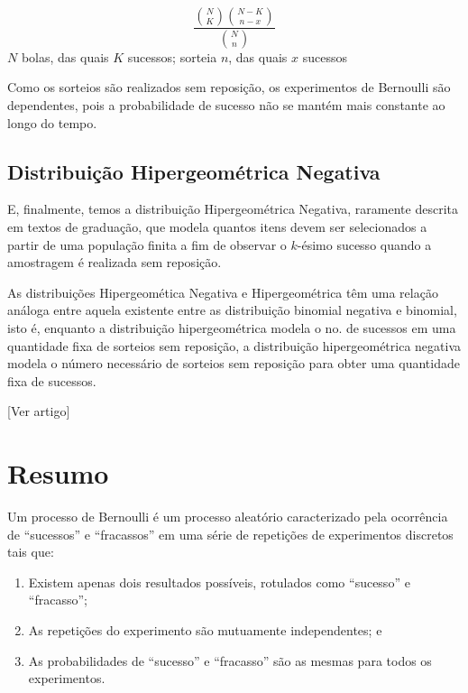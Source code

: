 \documentclass[
]{book}
\providecommand{\tightlist}{%
  \setlength{\itemsep}{0pt}\setlength{\parskip}{0pt}}
\theoremstyle{definition}
\theoremstyle{definition}
\theoremstyle{definition}
\theoremstyle{remark}
\begin{document}
\[\frac{\binom{N}{K}{\binom{N-K}{n-x}}}{\binom{N}{n}}\]
\(N\) bolas, das quais \(K\) sucessos; sorteia \(n\), das quais \(x\) sucessos

Como os sorteios são realizados sem reposição, os experimentos de Bernoulli são dependentes, pois a probabilidade de sucesso não se mantém mais constante ao longo do tempo.

\hypertarget{distribuiuxe7uxe3o-hipergeomuxe9trica-negativa}{%
\subsection*{Distribuição Hipergeométrica Negativa}\label{distribuiuxe7uxe3o-hipergeomuxe9trica-negativa}}

E, finalmente, temos a distribuição Hipergeométrica Negativa, raramente descrita em textos de graduação, que modela quantos itens devem ser selecionados a partir de uma população finita a fim de observar o \(k\)-ésimo sucesso quando a amostragem é realizada sem reposição.

As distribuições Hipergeomética Negativa e Hipergeométrica têm uma relação análoga entre aquela existente entre as distribuição binomial negativa e binomial, isto é, enquanto a distribuição hipergeométrica modela o no. de sucessos em uma quantidade fixa de sorteios sem reposição, a distribuição hipergeométrica negativa modela o número necessário de sorteios sem reposição para obter uma quantidade fixa de sucessos.

{[}Ver artigo{]}

\hypertarget{resumo-4}{%
\section*{Resumo}\label{resumo-4}}

Um processo de Bernoulli é um processo aleatório caracterizado pela ocorrência de ``sucessos'' e ``fracassos'' em uma série de repetições de experimentos discretos tais que:

\begin{enumerate}
\def\labelenumi{\roman{enumi}.}
\tightlist
\item
  Existem apenas dois resultados possíveis, rotulados como ``sucesso'' e ``fracasso'';\\
\item
  As repetições do experimento são mutuamente independentes; e\\
\item
  As probabilidades de ``sucesso'' e ``fracasso'' são as mesmas para todos os experimentos.
\end{enumerate}
\end{document}
